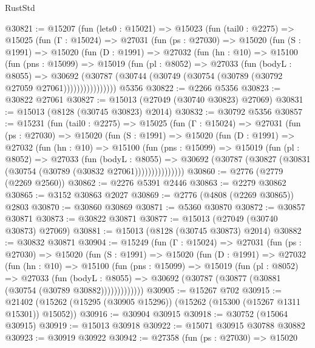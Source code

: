\begin{lexlean}{RustStd}
\begin{coremodule}
@30821 := @15207
    (fun (lets0 : @15021) =>
    @15023
      (fun (tail0 : @2275) =>
      @15025
        (fun (Γ : @15024) =>
        @27031
          (fun (ps : @27030) =>
          @15020
            (fun (S : @1991) =>
            @15020
              (fun (D : @1991) =>
              @27032
                (fun (hn : @10) =>
                @15100
                  (fun (pns : @15099) =>
                  @15019
                    (fun (pl : @8052) =>
                    @27033
                      (fun (bodyL : @8055) =>
                      @30692
                        (@30787
                          (@30744 (@30749 (@30754 (@30789 (@30792 @27059 @27061))))))))))))))))
    @5356
@30822 := @2266 @5356
@30823 := @30822 @27061
@30827 := @15013 (@27049 (@30740 @30823) @27069)
@30831 := @15013 (@8128 (@30745 @30823) @2014)
@30832 := @30792 @5356
@30857 := @15231
    (fun (tail0 : @2275) =>
    @15025
      (fun (Γ : @15024) =>
      @27031
        (fun (ps : @27030) =>
        @15020
          (fun (S : @1991) =>
          @15020
            (fun (D : @1991) =>
            @27032
              (fun (hn : @10) =>
              @15100
                (fun (pns : @15099) =>
                @15019
                  (fun (pl : @8052) =>
                  @27033
                    (fun (bodyL : @8055) =>
                    @30692 (@30787 (@30827 (@30831 (@30754 (@30789 (@30832 @27061)))))))))))))))
@30860 := @2776 (@2779 (@2269 @2560))
@30862 := @2276 @5391 @2446
@30863 := @2279 @30862
@30865 := @3152 @30863 @2027
@30869 := @2776 (@4808 (@2269 @30865)) @2803
@30870 := @30860 @30869
@30871 := @5360 @30870
@30872 := @30857 @30871
@30873 := @30822 @30871
@30877 := @15013 (@27049 (@30740 @30873) @27069)
@30881 := @15013 (@8128 (@30745 @30873) @2014)
@30882 := @30832 @30871
@30904 := @15249
    (fun (Γ : @15024) =>
    @27031
      (fun (ps : @27030) =>
      @15020
        (fun (S : @1991) =>
        @15020
          (fun (D : @1991) =>
          @27032
            (fun (hn : @10) =>
            @15100
              (fun (pns : @15099) =>
              @15019
                (fun (pl : @8052) =>
                @27033
                  (fun (bodyL : @8055) =>
                  @30692 (@30787 (@30877 (@30881 (@30754 (@30789 @30882)))))))))))))
@30905 := @15267 @702
@30915 := @21402 (@15262 (@15295 (@30905 @15296)) (@15262 (@15300 (@15267 @1311 @15301)) @15052))
@30916 := @30904 @30915
@30918 := @30752 (@15064 @30915)
@30919 := @15013 @30918
@30922 := @15071 @30915 @30788 @30882
@30923 := @30919 @30922
@30942 := @27358
    (fun (ps : @27030) =>
    @15020

\end{coremodule}
\end{lexlean}
